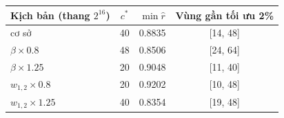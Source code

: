 \begin{tabular}{lccc}
\toprule
Kịch bản (thang $2^{16}$) & $c^*$ & $\min\hat r$ & Vùng gần tối ưu 2\% \\
\midrule
cơ sở & 40 & 0.8835 & [14, 48] \\
$\beta\times0.8$ & 48 & 0.8506 & [24, 64] \\
$\beta\times1.25$ & 20 & 0.9048 & [11, 40] \\
$w_{1,2}\times0.8$ & 20 & 0.9202 & [10, 48] \\
$w_{1,2}\times1.25$ & 40 & 0.8354 & [19, 48] \\
\bottomrule
\end{tabular}
